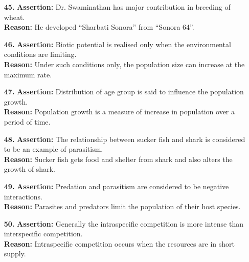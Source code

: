 \documentclass{article}
\begin{document}
\begin{enumerate}
    \item[\textbf{45.}] \textbf{Assertion:} Dr. Swaminathan has major contribution in breeding of wheat. \\
    \textbf{Reason:} He developed ``Sharbati Sonora'' from ``Sonora 64''.
    
    \item[\textbf{46.}] \textbf{Assertion:} Biotic potential is realised only when the environmental conditions are limiting. \\
    \textbf{Reason:} Under such conditions only, the population size can increase at the maximum rate.
    
    \item[\textbf{47.}] \textbf{Assertion:} Distribution of age group is said to influence the population growth. \\
    \textbf{Reason:} Population growth is a measure of increase in population over a period of time.
    
    \item[\textbf{48.}] \textbf{Assertion:} The relationship between sucker fish and shark is considered to be an example of parasitism. \\
    \textbf{Reason:} Sucker fish gets food and shelter from shark and also alters the growth of shark.
    
    \item[\textbf{49.}] \textbf{Assertion:} Predation and parasitism are considered to be negative interactions. \\
    \textbf{Reason:} Parasites and predators limit the population of their host species.
    
    \item[\textbf{50.}] \textbf{Assertion:} Generally the intraspecific competition is more intense than interspecific competition. \\
    \textbf{Reason:} Intraspecific competition occurs when the resources are in short supply.
\end{enumerate}
\end{document}
